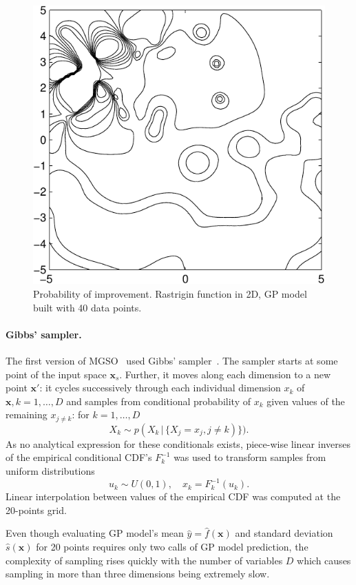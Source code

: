 \documentclass{itatnew}
\newcommand{\xx}{\mathrm{\mathbf{x}}}
\begin{document}
\begin{figure}
  \centering
  \includegraphics[width=0.6\linewidth]{poi_example}
  {\small
  \caption{Probability of improvement. Rastrigin function in 2D, GP model built with 40 data points.
  \label{fig:poi}
  }
  }
\end{figure}

\paragraph{Gibbs' sampler.}

The first version of MGSO~\cite{bajer_model_2013} used Gibbs' sampler~\cite{geman_stochastic_1984}. The sampler starts at some point of the input space $\xx_s$. Further, it moves along each dimension to a new point $\xx'$: it cycles successively through each individual dimension $x_k$ of $\xx, k = 1,\ldots,D$ and samples from conditional probability of $x_k$ given values of the remaining $x_{j \neq k}$: for $k=1,\ldots,D$
\begin{equation}
X_k \sim p(X_k \, | \, \{X_j = x_j, j \neq k)\}).
\end{equation}
As no analytical expression for these conditionals exists, piece-wise linear inverses of the empirical conditional CDF's $F^{-1}_k$ was used to transform samples from uniform distributions
\begin{displaymath}
u_k \sim U(0,1), \quad  x_k = F^{-1}_k(u_k).
\end{displaymath}
Linear interpolation between values of the empirical CDF was computed at the 20-points grid.

Even though evaluating GP model's mean $\hat{y} = \hat{f}(\xx)$ and standard deviation $\hat{s}(\xx)$ for 20 points requires only two calls of GP model prediction, the complexity of sampling rises quickly with the number of variables $D$ which causes sampling in more than three dimensions being extremely slow.
\end{document}

